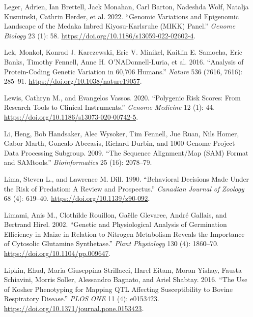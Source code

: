 \documentclass[
]{book}
\newlength{\cslhangindent}
\newlength{\cslentryspacingunit} %
\newenvironment{CSLReferences}[2] %
 {%
  \setlength{\parindent}{0pt}
  \ifodd #1
  \let\oldpar\par
  \def\par{\hangindent=\cslhangindent\oldpar}
  \fi
  \setlength{\parskip}{#2\cslentryspacingunit}
 }%
 {}
\begin{document}
\begin{CSLReferences}{1}{0}
\leavevmode{}%
Leger, Adrien, Ian Brettell, Jack Monahan, Carl Barton, Nadeshda Wolf, Natalja Kusminski, Cathrin Herder, et al. 2022. {``Genomic Variations and Epigenomic Landscape of the {Medaka Inbred Kiyosu-Karlsruhe} ({MIKK}) Panel.''} \emph{Genome Biology} 23 (1): 58. \url{https://doi.org/10.1186/s13059-022-02602-4}.

\leavevmode{}%
Lek, Monkol, Konrad J. Karczewski, Eric V. Minikel, Kaitlin E. Samocha, Eric Banks, Timothy Fennell, Anne H. O'NADonnell-Luria, et al. 2016. {``Analysis of Protein-Coding Genetic Variation in 60,706 Humans.''} \emph{Nature} 536 (7616, 7616): 285--91. \url{https://doi.org/10.1038/nature19057}.

\leavevmode{}%
Lewis, Cathryn M., and Evangelos Vassos. 2020. {``Polygenic Risk Scores: From Research Tools to Clinical Instruments.''} \emph{Genome Medicine} 12 (1): 44. \url{https://doi.org/10.1186/s13073-020-00742-5}.

\leavevmode{}%
Li, Heng, Bob Handsaker, Alec Wysoker, Tim Fennell, Jue Ruan, Nils Homer, Gabor Marth, Goncalo Abecasis, Richard Durbin, and 1000 Genome Project Data Processing Subgroup. 2009. {``The {Sequence} Alignment/Map ({SAM}) Format and {SAMtools}.''} \emph{Bioinformatics} 25 (16): 2078--79.

\leavevmode{}%
Lima, Steven L., and Lawrence M. Dill. 1990. {``Behavioral Decisions Made Under the Risk of Predation: A Review and Prospectus.''} \emph{Canadian Journal of Zoology} 68 (4): 619--40. \url{https://doi.org/10.1139/z90-092}.

\leavevmode{}%
Limami, Anis M., Clothilde Rouillon, Gaëlle Glevarec, André Gallais, and Bertrand Hirel. 2002. {``Genetic and {Physiological Analysis} of {Germination Efficiency} in {Maize} in {Relation} to {Nitrogen Metabolism Reveals} the {Importance} of {Cytosolic Glutamine Synthetase}.''} \emph{Plant Physiology} 130 (4): 1860--70. \url{https://doi.org/10.1104/pp.009647}.

\leavevmode{}%
Lipkin, Ehud, Maria Giuseppina Strillacci, Harel Eitam, Moran Yishay, Fausta Schiavini, Morris Soller, Alessandro Bagnato, and Ariel Shabtay. 2016. {``The {Use} of {Kosher Phenotyping} for {Mapping QTL Affecting Susceptibility} to {Bovine Respiratory Disease}.''} \emph{PLOS ONE} 11 (4): e0153423. \url{https://doi.org/10.1371/journal.pone.0153423}.


\end{CSLReferences}
\end{document}
